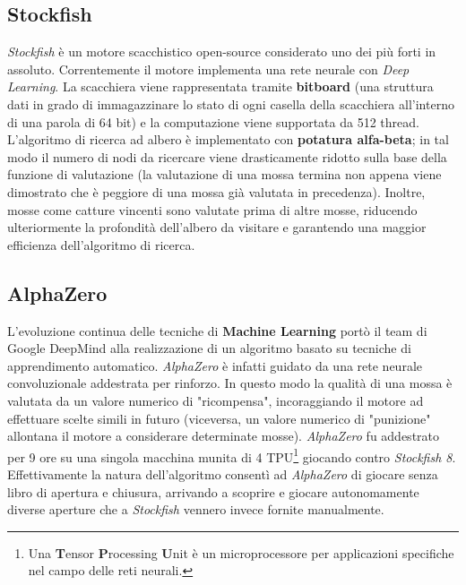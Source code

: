 \subsection{Stockfish}
\textit{Stockfish} è un motore scacchistico open-source considerato uno dei più forti in assoluto. Correntemente il motore implementa una rete neurale con \textit{Deep Learning}. La scacchiera viene rappresentata tramite \textbf{bitboard} (una struttura dati in grado di immagazzinare lo stato di ogni casella della scacchiera all’interno di una parola di 64 bit) e la computazione viene supportata da 512 thread. L'algoritmo di ricerca ad albero è implementato con \textbf{potatura alfa-beta}; in tal modo il numero di nodi da ricercare viene drasticamente ridotto sulla base della funzione di valutazione (la valutazione di una mossa termina non appena viene dimostrato che è peggiore di una mossa già valutata in precedenza). Inoltre, mosse come catture vincenti sono valutate prima di altre mosse, riducendo ulteriormente la profondità dell'albero da visitare e garantendo una maggior efficienza dell'algoritmo di ricerca\cite{enwiki:1105171756}.

\subsection{AlphaZero}
L'evoluzione continua delle tecniche di \textbf{Machine Learning} portò il team di Google DeepMind alla realizzazione di un algoritmo basato su tecniche di apprendimento automatico. \textit{AlphaZero} è infatti guidato da una rete neurale convoluzionale addestrata per rinforzo. In questo modo la qualità di una mossa è valutata da un valore numerico di "ricompensa", incoraggiando il motore ad effettuare scelte simili in futuro (viceversa, un valore numerico di "punizione" allontana il motore a considerare determinate mosse). \textit{AlphaZero} fu addestrato per 9 ore su una singola macchina munita di 4 TPU\footnote{Una \textbf{T}ensor \textbf{P}rocessing \textbf{U}nit è un microprocessore per applicazioni specifiche nel campo delle reti neurali.} giocando contro \textit{Stockfish 8}. Effettivamente la natura dell'algoritmo consentì ad \textit{AlphaZero} di giocare senza libro di apertura e chiusura, arrivando a scoprire e giocare autonomamente diverse aperture che a \textit{Stockfish} vennero invece fornite manualmente\cite{silver2018general}.





\newpage